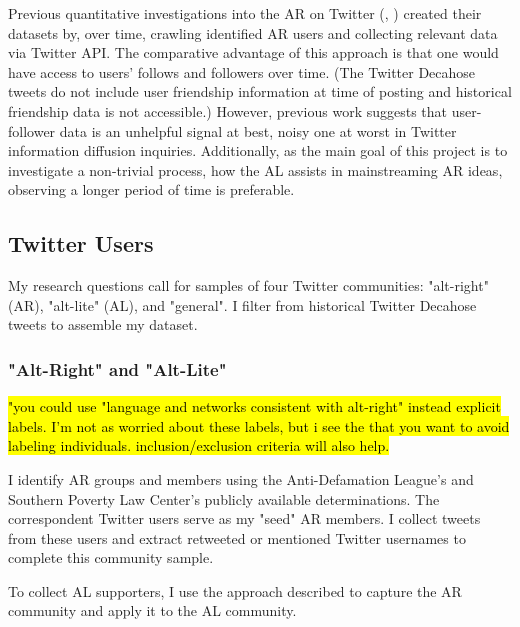 \documentclass[acmlarge, screen, authorversion]{acmart}
\begin{document}
    Previous quantitative investigations into the AR on Twitter (\cite{bergerAltrightTwitterCensus2018}, \cite{alizadehPsychologyMoralityPolitical2019}) created their datasets by, over time, crawling identified AR users and collecting relevant data via Twitter API. The comparative advantage of this approach is that one would have access to users' follows and followers over time. (The Twitter Decahose tweets do not include user friendship information at time of posting and historical friendship data is not accessible.) However, previous work \cite{chaMeasuringUserInfluence2010, versteegInformationtheoreticMeasuresInfluence2013} suggests that user-follower data is an unhelpful signal at best, noisy one at worst in Twitter information diffusion inquiries. Additionally, as the main goal of this project is to investigate a non-trivial process, how the AL assists in mainstreaming AR ideas, observing a longer period of time is preferable. 

\subsection{Twitter Users}

My research questions call for samples of four Twitter communities: "alt-right" (AR), "alt-lite" (AL), and "general". I filter from historical Twitter Decahose tweets to assemble my dataset.


    \subsubsection{"Alt-Right" and "Alt-Lite"}
    
    \hl{"you could use "language and networks consistent with alt-right" instead explicit labels. I'm not as worried about these labels, but i see the that you want to avoid labeling individuals. inclusion/exclusion criteria will also help.}

    I identify AR groups and members using the Anti-Defamation League's \cite{anti-defamationleagueAltRightAlt} and Southern Poverty Law Center's \cite{southernpovertylawcenterAltRight} publicly available determinations. The correspondent Twitter users serve as my "seed" AR members. I collect tweets from these users and extract retweeted or mentioned Twitter usernames to complete this community sample.
    
    To collect AL supporters, I use the approach described to capture the AR community and apply it to the AL community.
    
\end{document}
